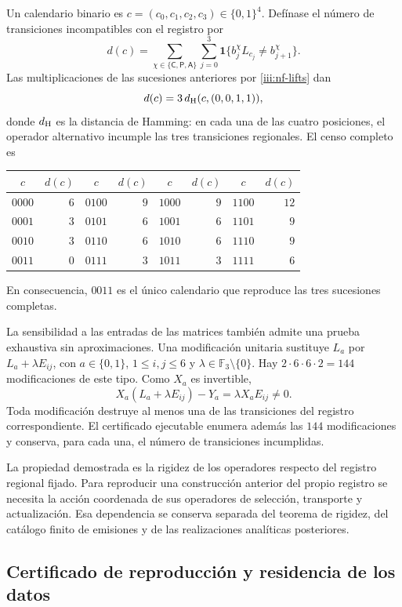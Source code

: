 Un calendario binario es $c=(c_0,c_1,c_2,c_3)\in\{0,1\}^4$.
Defínase el número de transiciones incompatibles con el registro por
\begin{equation}
 d(c)=\sum_{\chi\in\{\mathsf C,\mathsf P,\mathsf A\}}
       \sum_{j=0}^{3}
       \mathbf1\{b_j^\chi L_{c_j}\ne b_{j+1}^\chi\}.
 \label{iii:nf-calendario}
\end{equation}
Las multiplicaciones de las sucesiones anteriores por
\eqref{iii:nf-lifts} dan
\[
 d(c)=3\,d_{\rm H}(c,(0,0,1,1)),
\]
donde $d_{\rm H}$ es la distancia de Hamming: en cada una de las
cuatro posiciones, el operador alternativo incumple las tres
transiciones regionales. El censo completo es
\begin{center}
\begin{tabular}{cr@{\qquad}cr@{\qquad}cr@{\qquad}cr}
$c$&$d(c)$&$c$&$d(c)$&$c$&$d(c)$&$c$&$d(c)$\\ \hline
$0000$&$6$&$0100$&$9$&$1000$&$9$&$1100$&$12$\\
$0001$&$3$&$0101$&$6$&$1001$&$6$&$1101$&$9$\\
$0010$&$3$&$0110$&$6$&$1010$&$6$&$1110$&$9$\\
$0011$&$0$&$0111$&$3$&$1011$&$3$&$1111$&$6$
\end{tabular}
\end{center}
En consecuencia, $0011$ es el único calendario que reproduce las
tres sucesiones completas.

La sensibilidad a las entradas de las matrices también admite una
prueba exhaustiva sin aproximaciones. Una modificación unitaria
sustituye $L_a$ por $L_a+\lambda E_{ij}$, con
$a\in\{0,1\}$, $1\le i,j\le6$ y
$\lambda\in\mathbb F_3\setminus\{0\}$. Hay
$2\cdot6\cdot6\cdot2=144$ modificaciones de este tipo. Como
$X_a$ es invertible,
\[
 X_a(L_a+\lambda E_{ij})-Y_a
 =\lambda X_aE_{ij}\ne0.
\]
Toda modificación destruye al menos una de las transiciones del
registro correspondiente. El certificado ejecutable enumera además
las $144$ modificaciones y conserva, para cada una, el número de
transiciones incumplidas.

La propiedad demostrada es la rigidez de los operadores respecto del
registro regional fijado. Para reproducir una construcción anterior
del propio registro se necesita la acción coordenada de sus operadores
de selección, transporte y actualización. Esa dependencia se conserva
separada del teorema de rigidez, del catálogo finito de emisiones y
de las realizaciones analíticas posteriores.

\subsection{Certificado de reproducción y residencia de los datos}

